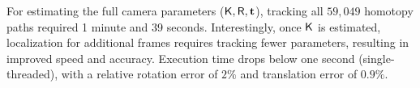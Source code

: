 For estimating the full camera parameters ($\mathsf{K}, \mathsf{R},\mathbf{t}$), tracking all $59,\!049$ homotopy paths required 1 minute and 39 seconds.
Interestingly, once $\mathsf{K}$ is estimated,  localization for additional frames requires tracking fewer parameters, resulting in improved speed and accuracy. Execution time drops below one second (single-threaded), with a relative rotation error of $2\%$ and translation error of $0.9\%$.%



